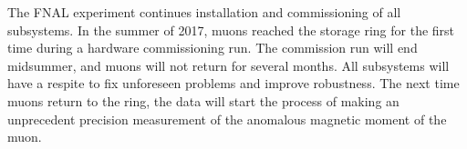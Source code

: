 The FNAL \mugmtwo experiment continues installation and commissioning of all subsystems.  In the summer of 2017, muons reached the storage ring for the first time during a hardware commissioning run.  The commission run will end midsummer, and muons will not return for several months.  All subsystems will have a respite to fix unforeseen problems and improve robustness.  The next time muons return to the \mugmtwo ring, the data will start the process of making an unprecedent precision measurement of the anomalous magnetic moment of the muon.







